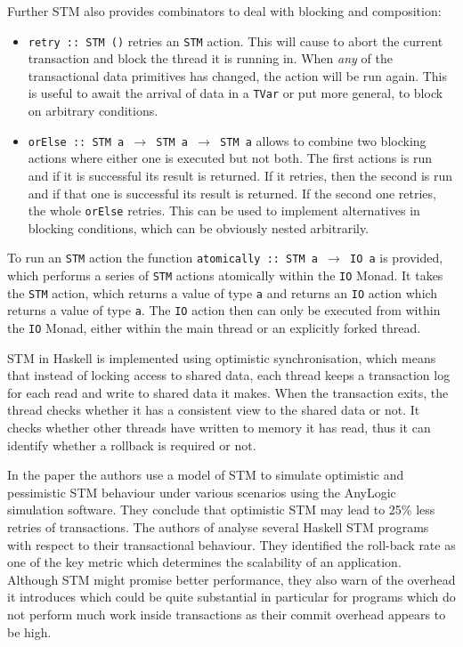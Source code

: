 Further STM also provides combinators to deal with blocking and composition:

\begin{itemize}
	\item \texttt{retry :: STM ()} retries an \texttt{STM} action. This will cause to abort the current transaction and block the thread it is running in. When \textit{any} of the transactional data primitives has changed, the action will be run again. This is useful to await the arrival of data in a \texttt{TVar} or put more general, to block on arbitrary conditions. 
	
	\item \texttt{orElse :: STM a $\rightarrow$ STM a $\rightarrow$ STM a} allows to combine two blocking actions where either one is executed but not both. The first actions is run and if it is successful its result is returned. If it retries, then the second is run and if that one is successful its result is returned. If the second one retries, the whole \texttt{orElse} retries. This can be used to implement alternatives in blocking conditions, which can be obviously nested arbitrarily.
\end{itemize}

To run an \texttt{STM} action the function \texttt{atomically :: STM a $\rightarrow$ IO a} is provided, which performs a series of \texttt{STM} actions atomically within the \texttt{IO} Monad. It takes the \texttt{STM} action, which returns a value of type \texttt{a} and returns an \texttt{IO} action which returns a value of type \texttt{a}. The \texttt{IO} action then can only be executed from within the \texttt{IO} Monad, either within the main thread or an explicitly forked thread.

STM in Haskell is implemented using optimistic synchronisation, which means that instead of locking access to shared data, each thread keeps a transaction log for each read and write to shared data it makes. When the transaction exits, the thread checks whether it has a consistent view to the shared data or not. It checks whether other threads have written to memory it has read, thus it can identify whether a rollback is required or not. %

In the paper \cite{heindl_modeling_2009} the authors use a model of STM to simulate optimistic and pessimistic STM behaviour under various scenarios using the AnyLogic simulation software. They conclude that optimistic STM may lead to 25\% less retries of transactions. The authors of \cite{perfumo_limits_2008} analyse several Haskell STM programs with respect to their transactional behaviour. They identified the roll-back rate as one of the key metric which determines the scalability of an application. Although STM might promise better performance, they also warn of the overhead it introduces which could be quite substantial in particular for programs which do not perform much work inside transactions as their commit overhead appears to be high.

